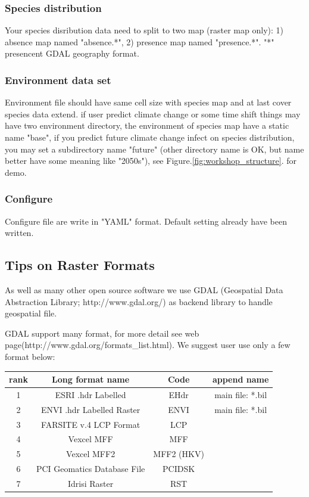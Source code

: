 \documentclass[10pt,a4paper]{report}
\begin{document}
\subsubsection{Species distribution}
Your species disribution data need to split to two map (raster map only): 1) absence map named "absence.*", 2) presence map named "presence.*". "*" presencent GDAL geography format.

\subsubsection{Environment data set}
Environment file should have same cell size with species map and at last cover species data extend. if user predict climate change or some time shift things may have two environment directory, the environment of species map have a static name "base", if you predict future climate change infect on species distribution, you may set a subdirectory name "future" (other directory name is OK, but name better have some meaning like "2050s"), see Figure.\ref{fig:workshop_structure}. for demo.

\subsubsection{Configure}
Configure file are write in "YAML" format. Default setting already have been written.

\subsection{Tips on Raster Formats}
As well as many other open source software we use GDAL (Geospatial Data Abstraction Library; http://www.gdal.org/) as backend library to handle geospatial file.

GDAL support many format, for more detail see web page(http://www.gdal.org/formats\_list.html). We suggest user use only a few format below:

\begin{tabular}{|c|c|c|c|}
\hline  rank & Long format name & Code & append name \\ 
\hline  1 & ESRI .hdr Labelled & EHdr & main file: *.bil \\ 
\hline  2 & ENVI .hdr Labelled Raster & ENVI & main file: *.bil \\ 
\hline  3 & FARSITE v.4 LCP Format & LCP &  \\ 
\hline  4 & Vexcel MFF & MFF &  \\ 
\hline  5 & Vexcel MFF2 & MFF2 (HKV) &  \\ 
\hline  6 & PCI Geomatics Database File & PCIDSK &  \\ 
\hline  7 & Idrisi Raster & RST &  \\ 
\hline 
\end{tabular}
\end{document}
